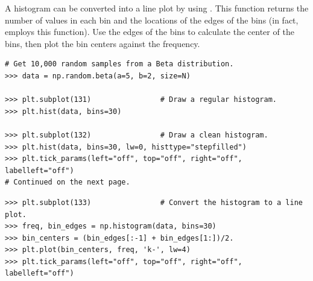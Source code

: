 A histogram can be converted into a line plot by using .
This function returns the number of values in each bin and the locations of the edges of the bins (in fact,  employs this function).
Use the edges of the bins to calculate the center of the bins, then plot the bin centers against the frequency.

\begin{lstlisting}
# Get 10,000 random samples from a Beta distribution.
>>> data = np.random.beta(a=5, b=2, size=N)

>>> plt.subplot(131)                # Draw a regular histogram.
>>> plt.hist(data, bins=30)

>>> plt.subplot(132)                # Draw a clean histogram.
>>> plt.hist(data, bins=30, lw=0, histtype="stepfilled")
>>> plt.tick_params(left="off", top="off", right="off", labelleft="off")
# Continued on the next page.
\end{lstlisting}

\newpage

\begin{lstlisting}
>>> plt.subplot(133)                # Convert the histogram to a line plot.
>>> freq, bin_edges = np.histogram(data, bins=30)
>>> bin_centers = (bin_edges[:-1] + bin_edges[1:])/2.
>>> plt.plot(bin_centers, freq, 'k-', lw=4)
>>> plt.tick_params(left="off", top="off", right="off", labelleft="off")
\end{lstlisting}

